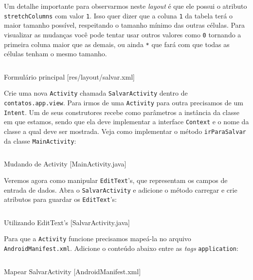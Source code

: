 Um detalhe importante para observarmos neste \emph{layout} é que ele
possui o atributo \texttt{stretchColumns} com valor \texttt{1}. Isso
quer dizer que a coluna \texttt{1} da tabela terá o maior tamanho
possível, respeitando o tamanho mínimo das outras células. Para
visualizar as mudanças você pode tentar usar outros valores como
\texttt{0} tornando a primeira coluna maior que as demais, ou ainda
\texttt{*} que fará com que todas as células tenham o mesmo tamanho.

\begin{listing}[H]
  \inputminted[linenos=true,frame=bottomline,tabsize=3]{ xml }{ source/salvar-1.xml }
  \caption{Formulário principal [res/layout/salvar.xml]}
\end{listing}

Crie uma nova \texttt{Activity} chamada \texttt{SalvarActivity} dentro
de \texttt{contatos.app.view}. Para irmos de uma \texttt{Activity} para
outra precisamos de um \texttt{Intent}. Um de seus construtores recebe
como parâmetros a instância da classe em que estamos, sendo que ela deve
implementar a interface \texttt{Context} e o nome da classe a qual deve
ser mostrada. Veja como implementar o método \texttt{irParaSalvar} da
classe \texttt{MainActivity}:

\begin{listing}[H]
  \inputminted[linenos=true,frame=bottomline,tabsize=3]{ java }{ source/MainActivity-3.java }
  \caption{Mudando de Activity [MainActivity.java]}
\end{listing}

Veremos agora como manipular \texttt{EditText}'s, que representam os
campos de entrada de dados. Abra o \texttt{SalvarActivity} e adicione o
método carregar e crie atributos para guardar os \texttt{EditText}'s:

\begin{listing}[H]
  \inputminted[linenos=true,frame=bottomline,tabsize=3]{ java }{ source/SalvarActivity-1.java }
  \caption{Utilizando EditText's [SalvarActivity.java]}
\end{listing}

Para que a \texttt{Activity} funcione precisamos mapeá-la no arquivo
\texttt{AndroidManifest.xml}. Adicione o conteúdo abaixo entre as
\emph{tags} \texttt{application}:

\begin{listing}[H]
  \inputminted[linenos=true,frame=bottomline,tabsize=3]{ xml }{ source/AndroidManifest-2.xml }
  \caption{Mapear SalvarActivity [AndroidManifest.xml]}
\end{listing}


